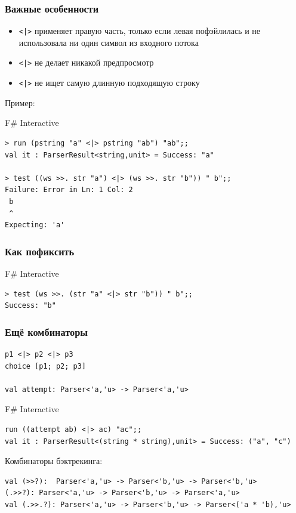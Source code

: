 \documentclass[xetex,mathserif,serif]{beamer}
\begin{document}
	\begin{frame}[fragile]
		\frametitle{Важные особенности}
		\begin{small}
			\begin{itemize}
				\item \verb!<|>! применяет правую часть, только если левая пофэйлилась и не использовала ни один символ из входного потока
				\item \verb!<|>! не делает никакой предпросмотр
				\item \verb!<|>! не ищет самую длинную подходящую строку
			\end{itemize}
			Пример:
			\begin{alertblock}{F\# Interactive}
				\begin{verbatim}
> run (pstring "a" <|> pstring "ab") "ab";;
val it : ParserResult<string,unit> = Success: "a"

> test ((ws >>. str "a") <|> (ws >>. str "b")) " b";;
Failure: Error in Ln: 1 Col: 2
 b
 ^
Expecting: 'a'
				\end{verbatim}
			\end{alertblock}
		\end{small}
	\end{frame}

	\begin{frame}[fragile]
		\frametitle{Как пофиксить}
		\begin{alertblock}{F\# Interactive}
			\begin{verbatim}
> test (ws >>. (str "a" <|> str "b")) " b";;
Success: "b"
			\end{verbatim}
		\end{alertblock}
	\end{frame}

	\begin{frame}[fragile]
		\frametitle{Ещё комбинаторы}
		\begin{verbatim}
p1 <|> p2 <|> p3
choice [p1; p2; p3]

val attempt: Parser<'a,'u> -> Parser<'a,'u>
		\end{verbatim}
		\begin{alertblock}{F\# Interactive}
			\begin{verbatim}
run ((attempt ab) <|> ac) "ac";;
val it : ParserResult<(string * string),unit> = Success: ("a", "c")
			\end{verbatim}
		\end{alertblock}
		Комбинаторы бэктрекинга:
		\begin{verbatim}
val (>>?):  Parser<'a,'u> -> Parser<'b,'u> -> Parser<'b,'u>
(.>>?): Parser<'a,'u> -> Parser<'b,'u> -> Parser<'a,'u>
val (.>>.?): Parser<'a,'u> -> Parser<'b,'u> -> Parser<('a * 'b),'u>
		\end{verbatim}
	\end{frame}
\end{document}
